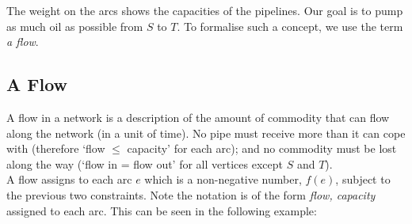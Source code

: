 The weight on the arcs shows the capacities of the pipelines. Our goal is to pump as much oil as possible from $S$ to $T$. To formalise such a concept, we use the term \textit{a flow}. 

\subsection{A Flow}
A flow in a network is a description of the amount of commodity that can flow along the network (in a unit of time). No pipe must receive more than it can cope with (therefore `flow $\leq$ capacity' for each arc); and no commodity must be lost along the way (`flow in = flow out' for all vertices except $S$ and $T$).\\

A flow assigns to each arc $e$ which is a non-negative number, $f(e)$, subject to the previous two constraints. Note the notation is of the form \textit{flow, capacity} assigned to each arc.  This can be seen in the following example:

